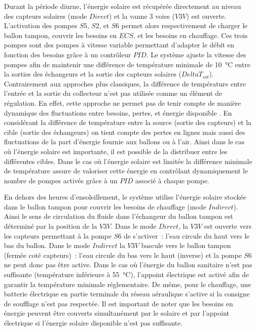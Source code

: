 Durant la période diurne, l’énergie solaire est récupérée directement au niveau des
capteurs solaires (mode $Direct$) et la vanne 3 voies ($V3V$) est ouverte. L’activation
des pompes $S5$, $S2$, et $S6$ permet alors respectivement de charger le ballon tampon,
couvrir les besoins en $ECS$, et les besoins en chauffage. Ces trois pompes sont des
pompes à vitesse variable permettant d’adapter le débit en fonction des besoins grâce à un
contrôleur $PID$. Le système ajuste la vitesse des pompes afin de maintenir une différence
de température minimale de \SI{10}{\celsius} entre la sorties des échangeurs et la sortie
des capteurs solaires ($DeltaT_{sol}$). Contrairement aux approches plus classiques, la
différence de température entre l’entrée et la sortie du collecteur n’est pas utilisée
comme un élément de régulation. En effet, cette approche ne permet pas de tenir compte de
manière dynamique des fluctuations entre besoins, pertes, et énergie disponible
\parencite{Mosallat2013686}. En considérant la différence de température entre la source
(sortie des capteurs) et la cible (sortie des échangeurs) on tient compte des pertes en
lignes mais aussi des fluctuations de la part d’énergie fournie aux ballons ou à l’air.
Ainsi dans le cas où l’énergie solaire est importante, il est possible de la distribuer
entre les différentes cibles. Dans le cas où l’énergie solaire est limitée la différence
minimale de température assure de valoriser cette énergie en contrôlant dynamiquement le
nombre de pompes activés grâce à un $PID$ associé à chaque pompe.

En dehors des heures d’ensoleillement, le système utilise l’énergie solaire stockée dans
le ballon tampon pour couvrir les besoins de chauffage (mode $Indirect$). Ainsi le sens de
circulation du fluide dans l’échangeur du ballon tampon est déterminé par la position de
la $V3V$. Dans le mode $Direct$, la $V3V$ est ouverte vers les capteurs permettant à la
pompe $S6$ de s’activer~: l’eau circule du haut vers le bas du ballon. Dans le mode
$Indirect$ la $V3V$ bascule vers le ballon tampon (fermée coté capteurs)~: l’eau circule
du bas vers le haut (inverse) et la pompe $S6$ ne peut donc pas être active.
Dans le cas où l’énergie du ballon sanitaire n’est pas suffisante (température inférieure
à \SI{55}{\celsius}), l’appoint électrique est activé afin de garantir la température
minimale réglementaire. De même, pour le chauffage, une batterie électrique en partie
terminale du réseau aéraulique s’active si la consigne de soufflage n’est pas respectée.
Il est important de noter que les besoins en énergie peuvent être couverts simultanément
par le solaire et par l’appoint électrique si l’énergie solaire disponible n’est pas
suffisante.

